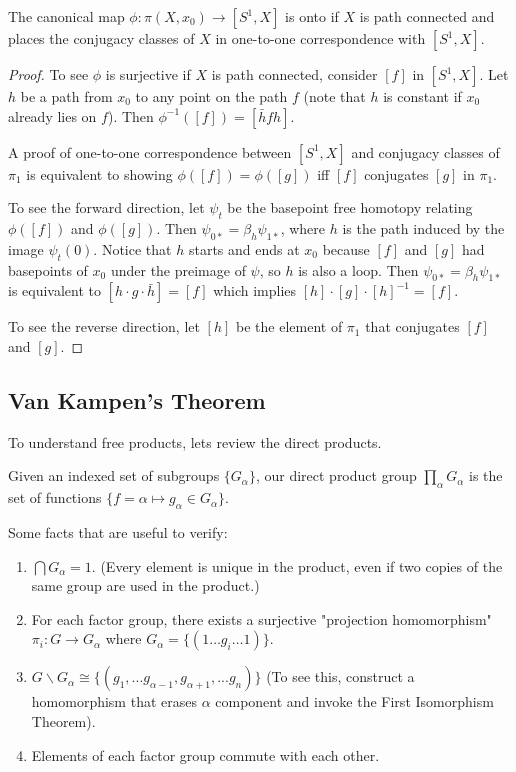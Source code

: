 \documentclass[10pt]{article}
\begin{document}
\begin{exercise}[1.1.6]
	The canonical map $\phi: \pi(X, x_0) \to [S^1, X]$ is onto if $X$ is path connected and places the conjugacy classes of $X$ in one-to-one correspondence with $[S^1, X]$.
\end{exercise}

\begin{proof}
	To see $\phi$ is surjective if $X$ is path connected, consider $[f]$ in $[S^1, X]$. Let $h$ be a path from $x_0$ to any point on the path $f$ (note that $h$ is constant if $x_0$ already lies on $f$). Then $\phi^{-1}([f]) = [\bar{h}fh]$.
	\par A proof of one-to-one correspondence between $[S^1, X]$ and conjugacy classes of $\pi_1$ is equivalent to showing $\phi([f]) = \phi([g])$ iff $[f]$ conjugates $[g]$ in $\pi_1$. 
	\par To see the forward direction, let $\psi_t$ be the basepoint free homotopy relating $\phi([f])$ and $\phi([g])$. Then $\psi_{0*} = \beta_h\psi_{1*}$, where $h$ is the path induced by the image $\psi_t(0)$. Notice that $h$ starts and ends at $x_0$ because $[f]$ and $[g]$ had basepoints of $x_0$ under the preimage of $\psi$, so $h$ is also a loop. Then $\psi_{0*} = \beta_h\psi_{1*}$ is equivalent to $[h \cdot g \cdot \bar{h}] = [f]$ which implies $[h] \cdot [g] \cdot [h]^{-1} = [f]$.
	\par To see the reverse direction, let $[h]$ be the element of $\pi_1$ that conjugates $[f]$ and $[g]$.

\end{proof}

\subsection{Van Kampen's Theorem}

To understand free products, lets review the direct products.

\begin{definition}
	Given an indexed set of subgroups $\{G_{\alpha}\}$, our direct product group $\prod_{\alpha} G_{\alpha}$ is the set of functions $\{ f = \alpha \mapsto g_{\alpha} \in G_{\alpha} \}$.
\end{definition}

Some facts that are useful to verify:

\begin{enumerate}
	\item{$\bigcap G_{\alpha} = 1$. (Every element is unique in the product, even if two copies of the same group are used in the product.)}
	\item{For each factor group, there exists a surjective "projection homomorphism" $\pi_i: G \to G_{\alpha}$ where $G_{\alpha} = \{(1 \dots g_i \dots 1) \}$. }
	\item{ $G \backslash G_{\alpha} \cong \{ (g_1, ... g_{\alpha-1}, g_{\alpha+1}, ...  g_n) \}$ (To see this, construct a homomorphism that erases $\alpha$ component and invoke the First Isomorphism Theorem).}
	\item{Elements of each factor group commute with each other.}
\end{enumerate}
\end{document}
